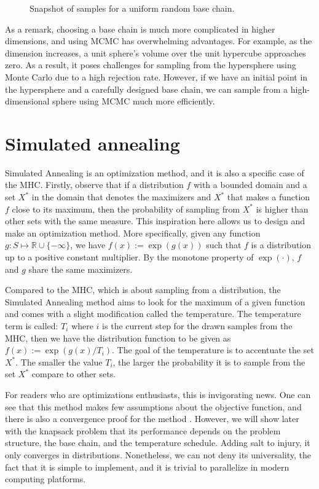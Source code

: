 \documentclass[]{article}
\theoremstyle{definition}
\begin{document}
\begin{figure}[H]
\begin{subfigure}{0.3\textwidth}
            \end{subfigure}
            \caption{Snapshot of samples for a uniform random base chain.}
            \label{fig:unif_rand_bc}
        \end{figure}
        As a remark, choosing a base chain is much more complicated in higher dimensions, and using MCMC has overwhelming advantages. For example, as the dimension increases, a unit sphere's volume over the unit hypercube approaches zero. As a result, it poses challenges for sampling from the hypersphere using Monte Carlo due to a high rejection rate. However, if we have an initial point in the hypersphere and a carefully designed base chain, we can sample from a high-dimensional sphere using MCMC much more efficiently. 

\section{Simulated annealing}
    Simulated Annealing is an optimization method, and it is also a specific case of the MHC. Firstly, observe that if a distribution $f$ with a bounded domain and a set $X^*$ in the domain that denotes the maximizers and $X^*$ that makes a function $f$ close to its maximum, then the probability of sampling from $X^*$ is higher than other sets with the same measure. This inspiration here allows us to design and make an optimization method. More specifically, given any function $g:S \mapsto \mathbb R \cup \{-\infty\}$, we have $f(x):= \exp(g(x))$ such that $f$ is a distribution up to a positive constant multiplier. By the monotone property of $\exp(\cdot)$, $f$ and $g$ share the same maximizers. 
    \par
    Compared to the MHC, which is about sampling from a distribution, the Simulated Annealing method aims to look for the maximum of a given function and comes with a slight modification called the temperature. The temperature term is called: $T_i$ where $i$ is the current step for the drawn samples from the MHC, then we have the distribution function to be given as $f(x):= \exp(g(x)/T_i)$. The goal of the temperature is to accentuate the set $X^*$. The smaller the value $T_i$, the larger the probability it is to sample from the set $X^*$ compare to other sets. 
    \par
    For readers who are optimizations enthusiasts, this is invigorating news. One can see that this method makes few assumptions about the objective function, and there is also a convergence proof for the method \cite{article:sim_anneal_1994}. However, we will show later with the knapsack problem that its performance depends on the problem structure, the base chain, and the temperature schedule. Adding salt to injury, it only converges in distributions. Nonetheless, we can not deny its universality, the fact that it is simple to implement, and it is trivial to parallelize in modern computing platforms. 
\end{document}
